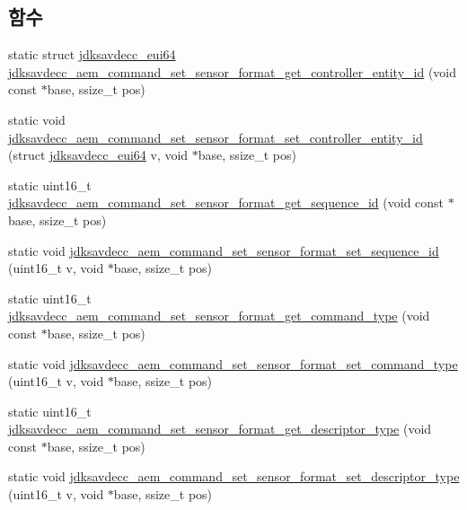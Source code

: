 \subsection*{함수}
\begin{DoxyCompactItemize}
\item 
static struct \hyperlink{structjdksavdecc__eui64}{jdksavdecc\+\_\+eui64} \hyperlink{group__command__set__sensor__format_gab968aff7261a0f9a29b5461e2779f60c}{jdksavdecc\+\_\+aem\+\_\+command\+\_\+set\+\_\+sensor\+\_\+format\+\_\+get\+\_\+controller\+\_\+entity\+\_\+id} (void const $\ast$base, ssize\+\_\+t pos)
\item 
static void \hyperlink{group__command__set__sensor__format_ga162bbfc837cb5ca23fff460c2c33f4ca}{jdksavdecc\+\_\+aem\+\_\+command\+\_\+set\+\_\+sensor\+\_\+format\+\_\+set\+\_\+controller\+\_\+entity\+\_\+id} (struct \hyperlink{structjdksavdecc__eui64}{jdksavdecc\+\_\+eui64} v, void $\ast$base, ssize\+\_\+t pos)
\item 
static uint16\+\_\+t \hyperlink{group__command__set__sensor__format_ga9e29823e398101472393b936e0e39932}{jdksavdecc\+\_\+aem\+\_\+command\+\_\+set\+\_\+sensor\+\_\+format\+\_\+get\+\_\+sequence\+\_\+id} (void const $\ast$base, ssize\+\_\+t pos)
\item 
static void \hyperlink{group__command__set__sensor__format_gae58f8dd99e19bebe9a4899f7723ac8ea}{jdksavdecc\+\_\+aem\+\_\+command\+\_\+set\+\_\+sensor\+\_\+format\+\_\+set\+\_\+sequence\+\_\+id} (uint16\+\_\+t v, void $\ast$base, ssize\+\_\+t pos)
\item 
static uint16\+\_\+t \hyperlink{group__command__set__sensor__format_ga72b6cceb4ae124008a4fb09f2fccaecc}{jdksavdecc\+\_\+aem\+\_\+command\+\_\+set\+\_\+sensor\+\_\+format\+\_\+get\+\_\+command\+\_\+type} (void const $\ast$base, ssize\+\_\+t pos)
\item 
static void \hyperlink{group__command__set__sensor__format_ga7eaafc56c878ea843c187533e3451ac0}{jdksavdecc\+\_\+aem\+\_\+command\+\_\+set\+\_\+sensor\+\_\+format\+\_\+set\+\_\+command\+\_\+type} (uint16\+\_\+t v, void $\ast$base, ssize\+\_\+t pos)
\item 
static uint16\+\_\+t \hyperlink{group__command__set__sensor__format_ga089952a6ff57752fcd3a70920f76a816}{jdksavdecc\+\_\+aem\+\_\+command\+\_\+set\+\_\+sensor\+\_\+format\+\_\+get\+\_\+descriptor\+\_\+type} (void const $\ast$base, ssize\+\_\+t pos)
\item 
static void \hyperlink{group__command__set__sensor__format_gae2e51e2c0aa70fca0f5eef87baf9f94b}{jdksavdecc\+\_\+aem\+\_\+command\+\_\+set\+\_\+sensor\+\_\+format\+\_\+set\+\_\+descriptor\+\_\+type} (uint16\+\_\+t v, void $\ast$base, ssize\+\_\+t pos)

\end{DoxyCompactItemize}
